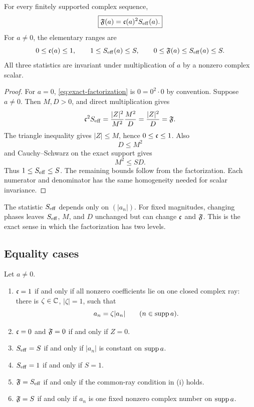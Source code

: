 \begin{theorem}
\label{thm:exact-factorization}
For every finitely supported complex sequence,
\begin{equation}
 \boxed{\mathfrak F(a)=\mathfrak c(a)^2S_{\mathrm{eff}}(a).}
\label{eq:exact-factorization}
\end{equation}
For \(a\ne0\), the elementary ranges are
\begin{equation}
 0\le\mathfrak c(a)\le1,\qquad
 1\le S_{\mathrm{eff}}(a)\le S,\qquad
 0\le\mathfrak F(a)\le S_{\mathrm{eff}}(a)\le S.
\label{eq:elementary-ranges}
\end{equation}
All three statistics are invariant under multiplication of \(a\)
by a nonzero complex scalar.
\end{theorem}

\begin{proof}
For \(a=0\), \eqref{eq:exact-factorization} is
\(0=0^2\cdot0\) by convention.  Suppose \(a\ne0\).
Then \(M,D>0\), and direct multiplication gives
\[
 \mathfrak c^2S_{\mathrm{eff}}
 =
 \frac{|Z|^2}{M^2}\frac{M^2}{D}
 =
 \frac{|Z|^2}{D}
 =
 \mathfrak F.
\]
The triangle inequality gives \(|Z|\le M\), hence
\(0\le\mathfrak c\le1\).  Also
\[
 D\le M^2
\]
and Cauchy--Schwarz on the exact support gives
\[
 M^2\le SD.
\]
Thus \(1\le S_{\mathrm{eff}}\le S\).  The remaining bounds follow from the
factorization.  Each numerator and denominator has the same
homogeneity needed for scalar invariance.
\end{proof}

\begin{remark}
\label{rem:magnitude-phase}
The statistic \(S_{\mathrm{eff}}\) depends only on
\((|a_n|)\).  For fixed magnitudes, changing phases leaves
\(S_{\mathrm{eff}}\), \(M\), and \(D\) unchanged but can change \(\mathfrak c\) and
\(\mathfrak F\).  This is the exact sense in which the factorization has
two levels.
\end{remark}

\subsection{Equality cases}

\begin{theorem}
\label{thm:equality-dictionary}
Let \(a\ne0\).
\begin{enumerate}[label=(\roman*),leftmargin=2.2em]
\item \(\mathfrak c=1\) if and only if all nonzero coefficients lie on one
closed complex ray: there is \(\zeta\in\mathbb C\), \(|\zeta|=1\), such
that
\[
 a_n=\zeta|a_n|
 \qquad(n\in\operatorname{supp} a).
\]
\par
\item \(\mathfrak c=0\) and \(\mathfrak F=0\) if and only if \(Z=0\).
\item \(S_{\mathrm{eff}}=S\) if and only if \(|a_n|\) is constant on
\(\operatorname{supp} a\).
\item \(S_{\mathrm{eff}}=1\) if and only if \(S=1\).
\item \(\mathfrak F=S_{\mathrm{eff}}\) if and only if the common-ray condition in
(i) holds.
\item \(\mathfrak F=S\) if and only if \(a_n\) is one fixed nonzero complex
number on \(\operatorname{supp} a\).
\end{enumerate}
\end{theorem}

